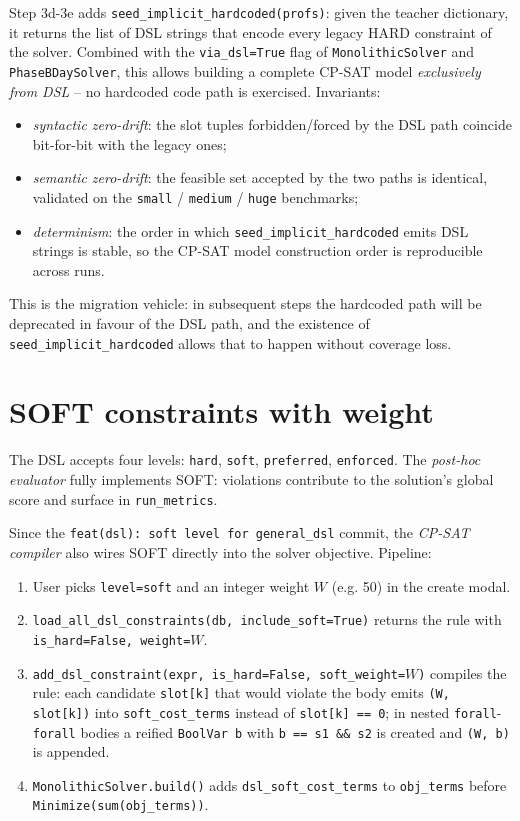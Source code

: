 Step 3d-3e adds \texttt{seed\_implicit\_hardcoded(profs)}: given
the teacher dictionary, it returns the list of DSL strings that
encode every legacy HARD constraint of the solver. Combined
with the \texttt{via\_dsl=True} flag of \texttt{MonolithicSolver}
and \texttt{PhaseBDaySolver}, this allows building a complete
CP-SAT model \emph{exclusively from DSL} -- no hardcoded code
path is exercised. Invariants:

\begin{itemize}
\item \emph{syntactic zero-drift}: the slot tuples
  forbidden/forced by the DSL path coincide bit-for-bit with
  the legacy ones;
\item \emph{semantic zero-drift}: the feasible set accepted by
  the two paths is identical, validated on the
  \texttt{small} / \texttt{medium} / \texttt{huge} benchmarks;
\item \emph{determinism}: the order in which
  \texttt{seed\_implicit\_hardcoded} emits DSL strings is
  stable, so the CP-SAT model construction order is
  reproducible across runs.
\end{itemize}

This is the migration vehicle: in subsequent steps the
hardcoded path will be deprecated in favour of the DSL path,
and the existence of \texttt{seed\_implicit\_hardcoded}
allows that to happen without coverage loss.

\section{SOFT constraints with weight}
\label{sec:dsl-soft-status-en}

The DSL accepts four levels: \texttt{hard}, \texttt{soft},
\texttt{preferred}, \texttt{enforced}. The \emph{post-hoc
evaluator} fully implements SOFT: violations contribute to the
solution's global score and surface in \texttt{run\_metrics}.

Since the \texttt{feat(dsl): soft level for general\_dsl}
commit, the \emph{CP-SAT compiler} also wires SOFT directly
into the solver objective. Pipeline:

\begin{enumerate}
\item User picks \texttt{level=soft} and an integer weight $W$
  (e.g. 50) in the create modal.
\item \texttt{load\_all\_dsl\_constraints(db,
  include\_soft=True)} returns the rule with
  \texttt{is\_hard=False, weight=$W$}.
\item \texttt{add\_dsl\_constraint(expr, is\_hard=False,
  soft\_weight=$W$)} compiles the rule: each candidate
  \texttt{slot[k]} that would violate the body emits
  \texttt{(W, slot[k])} into \texttt{soft\_cost\_terms}
  instead of \texttt{slot[k] == 0}; in nested
  \texttt{forall}-\texttt{forall} bodies a reified
  \texttt{BoolVar b} with \texttt{b == s1 \&\& s2} is created
  and \texttt{(W, b)} is appended.
\item \texttt{MonolithicSolver.build()} adds
  \texttt{dsl\_soft\_cost\_terms} to \texttt{obj\_terms}
  before \texttt{Minimize(sum(obj\_terms))}.
\end{enumerate}

